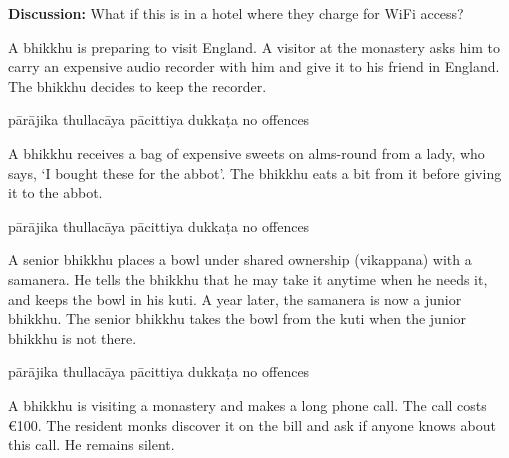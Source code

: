 \begin{exam}{\autoExamName}
\begin{problem*}
\begin{parts}
  \bigskip

  \textbf{Discussion:} What if this is in a hotel where they charge for WiFi access?

  \bigskip

  \item A bhikkhu is preparing to visit England. A visitor at the monastery asks
    him to carry an expensive audio recorder with him and give it to his friend in
    England. The bhikkhu decides to keep the recorder.

  \bigskip

  \begin{answers}{5}
    \bChoices
     pārājika\eAns
     thullacāya\eAns
     pācittiya\eAns
     dukkaṭa\eAns
     no offences\eAns
    \eChoices
  \end{answers}

  \bigskip

  \item A bhikkhu receives a bag of expensive sweets on alms-round from a lady, who
  says, `I bought these for the abbot'. The bhikkhu eats a bit from it before giving it
  to the abbot.

  \bigskip

  \begin{answers}{5}
    \bChoices
     pārājika\eAns
     thullacāya\eAns
     pācittiya\eAns
     dukkaṭa\eAns
     no offences\eAns
    \eChoices
  \end{answers}

  \bigskip

  \item A senior bhikkhu places a bowl under shared ownership (vikappana) with a samanera.
  He tells the bhikkhu that he may take it anytime when he needs it, and keeps the bowl in his kuti.
  A year later, the samanera is now a junior bhikkhu.
  The senior bhikkhu takes the bowl from the kuti when the junior bhikkhu is not there.

  \bigskip

  \begin{answers}{5}
    \bChoices
     pārājika\eAns
     thullacāya\eAns
     pācittiya\eAns
     dukkaṭa\eAns
     no offences\eAns
    \eChoices
  \end{answers}

  \item A bhikkhu is visiting a monastery and makes a long phone call. The call
  costs €100. The resident monks discover it on the bill and ask if
  anyone knows about this call. He remains silent.


\end{parts}
\end{problem*}
\end{exam}
